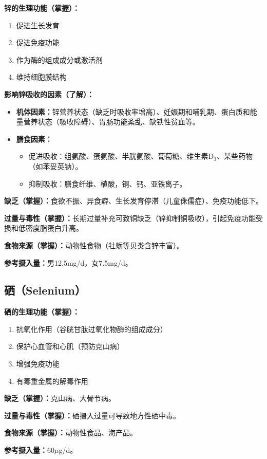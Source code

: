 \begin{keybox}
\textbf{锌的生理功能（掌握）：}
\begin{enumerate}[leftmargin=*]
    \item 促进生长发育
    \item 促进免疫功能
    \item 作为酶的组成成分或激活剂
    \item 维持细胞膜结构
\end{enumerate}

\textbf{影响锌吸收的因素（了解）：}
\begin{itemize}[leftmargin=*]
    \item \textbf{机体因素：}锌营养状态（缺乏时吸收率增高）、妊娠期和哺乳期、蛋白质和能量营养状态（吸收障碍）、胃肠功能紊乱、缺铁性贫血等。
    \item \textbf{膳食因素：}
    \begin{itemize}[leftmargin=*]
        \item 促进吸收：组氨酸、蛋氨酸、半胱氨酸、葡萄糖、维生素D$_3$、某些药物（如苯妥英钠）。
        \item 抑制吸收：膳食纤维、植酸，铜、钙、亚铁离子。
    \end{itemize}
\end{itemize}

\difficulty \textbf{缺乏（掌握）：}食欲不振、异食癖、生长发育停滞（儿童侏儒症）、免疫功能低下。

\difficulty \textbf{过量与毒性（掌握）：}长期过量补充可致铜缺乏（锌抑制铜吸收），引起免疫功能受损和低密度脂蛋白升高。

\textbf{食物来源（掌握）：}动物性食物（牡蛎等贝类含锌丰富）。

\textbf{参考摄入量：}男12.5mg/d，女7.5mg/d。
\end{keybox}

\subsection{硒（Selenium）}

\begin{keybox}
\textbf{硒的生理功能（掌握）：}
\begin{enumerate}[leftmargin=*]
    \item 抗氧化作用（谷胱甘肽过氧化物酶的组成成分）
    \item 保护心血管和心肌（预防克山病）
    \item 增强免疫功能
    \item 有毒重金属的解毒作用
\end{enumerate}


\difficulty \textbf{缺乏（掌握）：}克山病、大骨节病。

\difficulty \textbf{过量与毒性（掌握）：}硒摄入过量可导致地方性硒中毒。

\textbf{食物来源（掌握）：}动物性食品、海产品。

\textbf{参考摄入量：}60$\mu$g/d。
\end{keybox}


